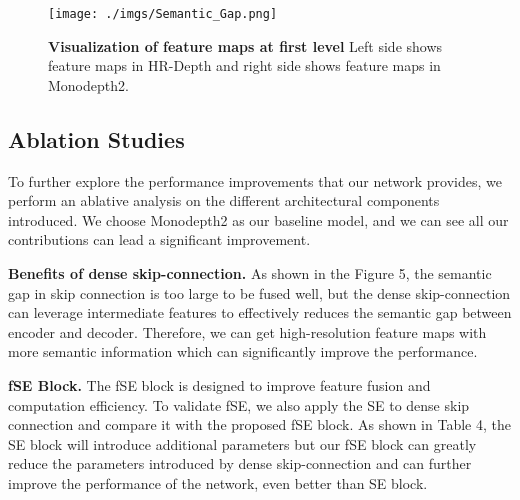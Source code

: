 \documentclass[letterpaper]{article} \usepackage{aaai21}  \usepackage{times}  \usepackage{helvet} \usepackage{courier}  \usepackage[hyphens]{url}  \usepackage{graphicx} \urlstyle{rm} \def\UrlFont{\rm}  \usepackage{natbib}  \usepackage{caption} \frenchspacing  \setlength{\pdfpagewidth}{8.5in}  \setlength{\pdfpageheight}{11in}  \usepackage{booktabs}
\begin{document}
\begin{figure}[!ht]
    \centering
    \texttt{[image: ./imgs/Semantic\_Gap.png]} 
    \caption{\textbf{Visualization of feature maps at first level} Left side shows feature maps in HR-Depth and right side shows feature maps in Monodepth2.}
\label{fig5}
\end{figure}

\subsection{Ablation Studies}
To further explore the performance improvements that our network provides, we perform an ablative analysis on the different architectural components introduced. We choose Monodepth2 as our baseline model, and we can see 
all our contributions can lead a significant improvement. 

\noindent\textbf{Benefits of dense skip-connection.} As shown in the Figure 5, the semantic gap in skip connection is too large to be fused well, but the dense skip-connection can leverage intermediate features to 
effectively reduces the semantic gap between encoder and decoder. Therefore, we can get high-resolution feature maps with more semantic information which can significantly improve the performance. 

\noindent\textbf{fSE Block.} The fSE block is designed to improve feature fusion and computation efficiency. To validate fSE, we also apply the SE\cite{hu2019squeeze-and-excitation} to dense skip connection and 
compare it with the proposed fSE block. As shown in Table 4, the SE block will introduce additional parameters but our fSE block can greatly reduce the
parameters introduced by dense skip-connection and can further improve the performance of the network, even better than SE block.

\begin{table}[!ht]
    \caption{\textbf{Ablation Studies.} Results for different variants of our model with monocular training on KITTI at low resolution on Eigen split. The baseline model is Monodepth2. We introduce the dense skip-connection(dense SC)
    to original structure and compare effect of SE block and fSE block.}
    \label{tab:4}
\end{table}
\end{document}
